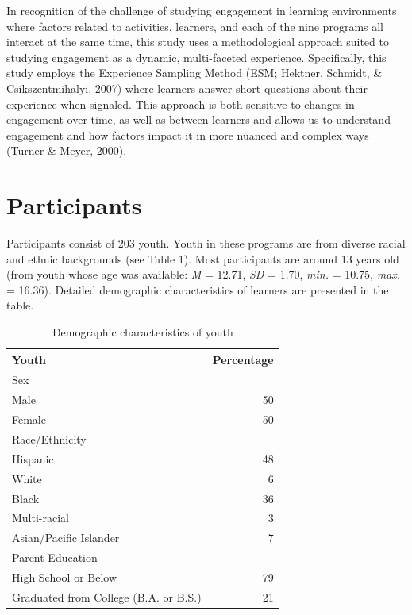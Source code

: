 \documentclass[]{book}
\theoremstyle{definition}
\theoremstyle{definition}
\theoremstyle{definition}
\theoremstyle{remark}
\begin{document}
In recognition of the challenge of studying engagement in learning
environments where factors related to activities, learners, and each of
the nine programs all interact at the same time, this study uses a
methodological approach suited to studying engagement as a dynamic,
multi-faceted experience. Specifically, this study employs the
Experience Sampling Method (ESM; Hektner, Schmidt, \& Csikszentmihalyi,
2007) where learners answer short questions about their experience when
signaled. This approach is both sensitive to changes in engagement over
time, as well as between learners and allows us to understand engagement
and how factors impact it in more nuanced and complex ways (Turner \&
Meyer, 2000).

\section{Participants}\label{participants}

Participants consist of 203 youth. Youth in these programs are from
diverse racial and ethnic backgrounds (see Table 1). Most participants
are around 13 years old (from youth whose age was available: \emph{M} =
12.71, \emph{SD} = 1.70, \emph{min.} = 10.75, \emph{max.} = 16.36).
Detailed demographic characteristics of learners are presented in the
table.

\begin{table}

\caption{\label{tab:unnamed-chunk-3}Demographic characteristics of youth}
\centering
\begin{tabular}[t]{lr}
\toprule
Youth & Percentage\\
\midrule
Sex & \\
Male & 50\\
Female & 50\\
Race/Ethnicity & \\
Hispanic & 48\\
\addlinespace
White & 6\\
Black & 36\\
Multi-racial & 3\\
Asian/Pacific Islander & 7\\
Parent Education & \\
\addlinespace
High School or Below & 79\\
Graduated from College (B.A. or B.S.) & 21\\
\bottomrule
\end{tabular}
\end{table}
\end{document}
